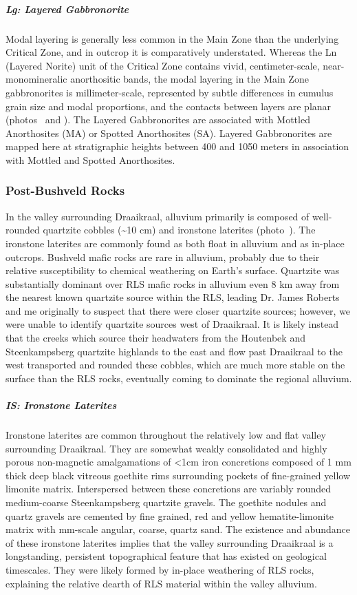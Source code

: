 \subparagraph{Lg: Layered Gabbronorite}
\label{sec:ch5-unit-lg}

Modal layering is generally less common in the Main Zone than the
underlying Critical Zone, and in outcrop it is comparatively
understated. Whereas the Ln (Layered Norite) unit of the Critical Zone
contains vivid, centimeter-scale, near-monomineralic anorthositic bands,
the modal layering in the Main Zone gabbronorites is millimeter-scale,
represented by subtle differences in cumulus grain size and modal
proportions, and the contacts between layers are planar (photos~ and
). The Layered Gabbronorites are associated with Mottled Anorthosites
(MA) or Spotted Anorthosites (SA).  Layered
Gabbronorites are mapped here at stratigraphic heights between 400 and 1050 meters in association with Mottled and Spotted Anorthosites.



\subsubsection{Post-Bushveld Rocks}
\label{sec:ch5-post-bushveld-rocks}

In the valley surrounding Draaikraal, alluvium primarily is composed of
well-rounded quartzite cobbles (\textasciitilde10 cm) and ironstone
laterites (photo~). The ironstone laterites are commonly found as both float in
alluvium and as in-place outcrops. Bushveld mafic rocks are rare in
alluvium, probably due to their relative susceptibility to chemical
weathering on Earth's surface. Quartzite was substantially dominant over
RLS mafic rocks in alluvium even 8 km away from the nearest known
quartzite source within the RLS, leading Dr. James Roberts and me
originally to suspect that there were closer quartzite sources; however,
we were unable to identify quartzite sources west of Draaikraal. It is
likely instead that the creeks which source their headwaters from the
Houtenbek and Steenkampsberg quartzite highlands to the east and flow
past Draaikraal to the west transported and rounded these cobbles,
which are much more stable on the surface than the RLS rocks, eventually
coming to dominate the regional alluvium.

\subparagraph{IS: Ironstone Laterites}
\label{sec:ch5-unit-is}

Ironstone laterites are common throughout the relatively low and flat
valley surrounding Draaikraal. They are somewhat weakly consolidated and
highly porous non-magnetic amalgamations of \textless1cm iron
concretions composed of 1 mm thick deep black vitreous goethite rims
surrounding pockets of fine-grained yellow limonite matrix. Interspersed
between these concretions are variably rounded medium-coarse
Steenkampsberg quartzite gravels. The goethite nodules and quartz
gravels are cemented by fine grained, red and yellow hematite-limonite
matrix with mm-scale angular, coarse, quartz sand. The existence and
abundance of these ironstone laterites implies that the valley
surrounding Draaikraal is a longstanding, persistent topographical
feature that has existed on geological timescales. They were likely
formed by in-place weathering of RLS rocks, explaining the relative
dearth of RLS material within the valley alluvium.

